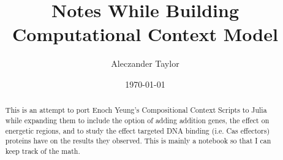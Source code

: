 \documentclass{article}
\title{Notes While Building Computational Context Model}
\author{Aleczander Taylor}
\date{\today}
\begin{document}
\maketitle
\begin{abstract}
  This is an attempt to port Enoch Yeung's Compositional Context Scripts to Julia while 
  expanding them to include the option of adding addition genes, the effect on energetic 
  regions, and to study the effect targeted DNA binding (i.e. Cas effectors) proteins
  have on the results they observed. This is mainly a notebook so that I can keep track of
  the math.
\end{abstract}
  
\end{document}
